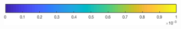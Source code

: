 \documentclass{article}
\begin{document}
\begin{figure}[htp]
\begin{subfigure}{.33\textwidth}
 \label{fig:nutrients2}
\end{subfigure}
\\[+0.2cm]
\begin{subfigure}{.5\textwidth}
 \includegraphics[width=0.95\linewidth]{../Separate_figures/ECOGEM/ocn_TDFe_profile_clrbr.png}
\end{subfigure}
\end{figure}
\end{document}
